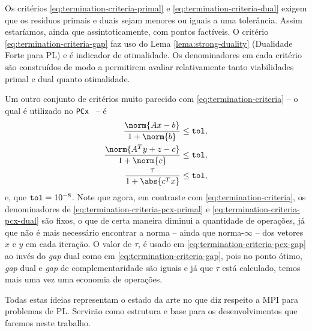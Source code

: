 Os critérios
\eqref{eq:termination-criteria-primal} e \eqref{eq:termination-criteria-dual}
exigem que os resíduos primais e duais sejam menores ou iguais a uma tolerância.
Assim estaríamos, ainda que assintoticamente, com pontos factíveis. O critério
\eqref{eq:termination-criteria-gap} faz uso do Lema
\ref{lema:strong-duality} (Dualidade Forte para \ac{PL}) e é indicador de
otimalidade. Os denominadores em cada critério são construídos de modo a 
permitirem avaliar relativamente tanto viabilidades primal e dual quanto
otimalidade.
  
Um outro conjunto de critérios muito parecido  com
\eqref{eq:termination-criteria}  -- o qual é utilizado no \texttt{PCx}~\cite{Czyzyk:1999hk}  -- é
\begin{subequations}
\label{eq:termination-criteria-pcx}
\begin{align}
	\dfrac{\norm{Ax - b}}{1 + \norm{b}} \leq \tol,
	\label{eq:termination-criteria-pcx-primal}\\
	\dfrac{\norm{A^Ty + z - c}}{1 + \norm{c}} \leq \tol,
	\label{eq:termination-criteria-pcx-dual}\\
	\dfrac{\tau}{1 + \abs{c^Tx}}\leq
	\tol,\label{eq:termination-criteria-pcx-gap}
\end{align}
\end{subequations}
e, que $\mathtt{tol} = 10^{-8}$. Note que agora, em contraste com
\eqref{eq:termination-criteria}, os denominadores de 
\eqref{eq:termination-criteria-pcx-primal} e
\eqref{eq:termination-criteria-pcx-dual} são fixos, o que de certa maneira
diminui a quantidade de operações, já que não é mais necessário encontrar a
norma  -- ainda que norma-$\infty$ --  dos vetores $x$ e $y$ em cada
iteração. O valor de $\tau$,  é usado em \eqref{eq:termination-criteria-pcx-gap} ao
 invés do \emph{gap} dual  como em \eqref{eq:termination-criteria-gap}, pois no ponto
 ótimo, \emph{gap} dual e \emph{gap} de complementaridade são iguais e já que $\tau$ está
calculado, temos mais uma vez uma economia de operações. 




Todas estas ideias representam o estado da arte no que diz respeito a \ac{MPI}
para problemas de \ac{PL}. Servirão como estrutura e base para os
desenvolvimentos que faremos neste trabalho.
